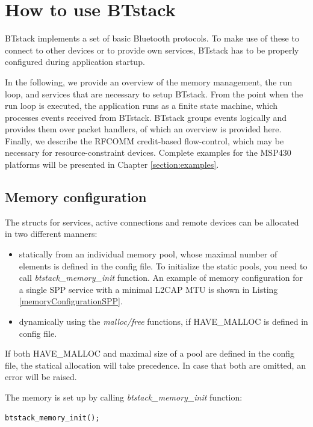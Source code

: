 \documentclass[a4paper,titlepage,oneside,12pt]{amsart} %
\begin{document}
\section{How to use BTstack}
BTstack implements a set of basic Bluetooth protocols. To make use of these to connect to other devices or to provide own services, BTstack has to be properly configured during application startup. 

In the following, we provide an overview of the memory management, the run loop, and services that are necessary to setup BTstack. From the point when the run loop is executed, the application runs as a finite state machine, which processes events received from BTstack. BTstack groups events logically and provides them over packet handlers, of which an overview is provided here. Finally, we describe the RFCOMM credit-based flow-control, which may be necessary for resource-constraint devices. Complete examples for the MSP430 platforms will be presented in Chapter \ref{section:examples}. 

\subsection{Memory configuration}
\label{section:memory_configuration}

The structs for services, active connections and remote devices can be allocated in two different manners: 
        \begin{itemize}
        \item statically from an individual memory pool, whose maximal number of elements  is defined in the config file. To initialize the static pools, you need to call \emph{btstack\_memory\_init} function. An example of memory configuration for a single SPP service with a minimal L2CAP MTU is shown in Listing \ref{memoryConfigurationSPP}.
        \item dynamically using the \emph{malloc/free} functions, if HAVE\_MALLOC is defined in config file. 
        \end{itemize}

If both HAVE\_MALLOC and  maximal size of a pool are defined in the config file, the statical allocation will take precedence. In case that both are omitted, an error will be raised.

The memory is set up by calling \emph{btstack\_memory\_init} function:
\begin{lstlisting}
btstack_memory_init();
\end{lstlisting}
\end{document}
